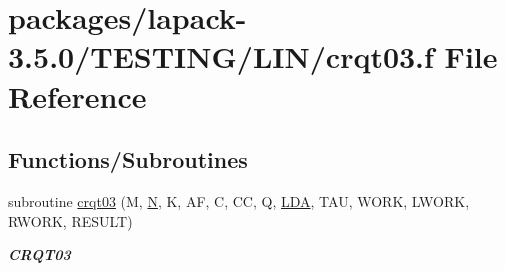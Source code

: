 \hypertarget{crqt03_8f}{}\section{packages/lapack-\/3.5.0/\+T\+E\+S\+T\+I\+N\+G/\+L\+I\+N/crqt03.f File Reference}
\label{crqt03_8f}
\subsection*{Functions/\+Subroutines}
\begin{DoxyCompactItemize}
\item 
subroutine \hyperlink{group__complex__lin_ga5e3d90595708a5e4309b8a0a21c9cb46}{crqt03} (M, \hyperlink{polmisc_8c_a0240ac851181b84ac374872dc5434ee4}{N}, K, A\+F, C, C\+C, Q, \hyperlink{example__user_8c_ae946da542ce0db94dced19b2ecefd1aa}{L\+D\+A}, T\+A\+U, W\+O\+R\+K, L\+W\+O\+R\+K, R\+W\+O\+R\+K, R\+E\+S\+U\+L\+T)
\begin{DoxyCompactList}\small\item\em {\bfseries C\+R\+Q\+T03} \end{DoxyCompactList}\end{DoxyCompactItemize}
